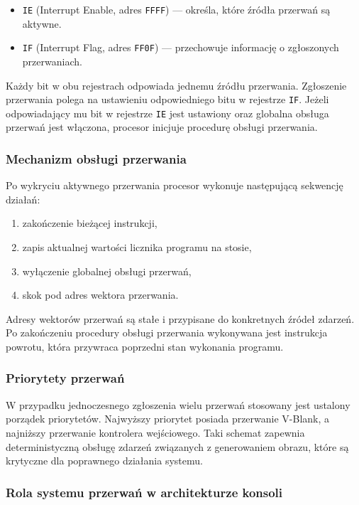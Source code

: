 \documentclass{article}
\begin{document}
\begin{itemize}
	\item \texttt{IE} (Interrupt Enable, adres \texttt{FFFF}) --- określa, które źródła przerwań są aktywne.
	\item \texttt{IF} (Interrupt Flag, adres \texttt{FF0F}) --- przechowuje informację o zgłoszonych przerwaniach.
\end{itemize}

Każdy bit w obu rejestrach odpowiada jednemu źródłu przerwania. Zgłoszenie przerwania polega na ustawieniu odpowiedniego bitu w rejestrze \texttt{IF}. Jeżeli odpowiadający mu bit w rejestrze \texttt{IE} jest ustawiony oraz globalna obsługa przerwań jest włączona, procesor inicjuje procedurę obsługi przerwania.

\subsubsection{Mechanizm obsługi przerwania}

Po wykryciu aktywnego przerwania procesor wykonuje następującą sekwencję działań:

\begin{enumerate}
	\item zakończenie bieżącej instrukcji,
	\item zapis aktualnej wartości licznika programu na stosie,
	\item wyłączenie globalnej obsługi przerwań,
	\item skok pod adres wektora przerwania.
\end{enumerate}

Adresy wektorów przerwań są stałe i przypisane do konkretnych źródeł zdarzeń. Po zakończeniu procedury obsługi przerwania wykonywana jest instrukcja powrotu, która przywraca poprzedni stan wykonania programu.

\subsubsection{Priorytety przerwań}

W przypadku jednoczesnego zgłoszenia wielu przerwań stosowany jest ustalony porządek priorytetów. Najwyższy priorytet posiada przerwanie V-Blank, a najniższy przerwanie kontrolera wejściowego. Taki schemat zapewnia deterministyczną obsługę zdarzeń związanych z generowaniem obrazu, które są krytyczne dla poprawnego działania systemu.

\subsubsection{Rola systemu przerwań w architekturze konsoli}
\end{document}
